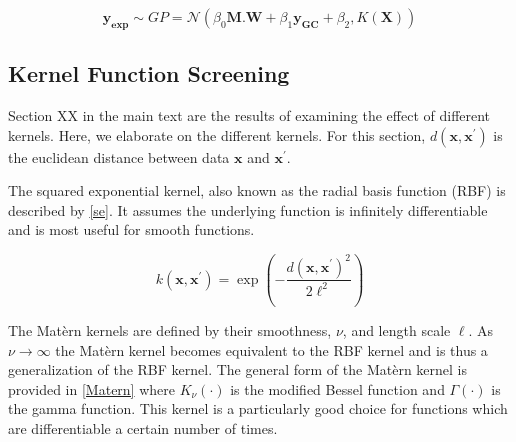\documentclass[journal=jacsat,manuscript=article]{achemso}
\begin{document}
\begin{equation}
    \mathbf{y_{\text{exp}}} \sim GP = \mathcal{N}\left( \beta_{0} \mathbf{M.W} + \beta_{1} \mathbf{y_{GC}} +\beta_{2} , K(\mathbf{X}) \right)
    \label{Method_5}
\end{equation}



\subsection{Kernel Function Screening}

Section XX in the main text are the results of examining the effect of different kernels. Here, we elaborate on the different kernels. For this section, $d(\mathbf{x}, \mathbf{x}^{\prime})$ is the euclidean distance between data $\mathbf{x}$ and $\mathbf{x}^{\prime}$.

The squared exponential kernel, also known as the radial basis function (RBF) is described by \eqref{se}. It assumes the underlying function is infinitely differentiable and is most useful for smooth functions.

\begin{equation}
    k(\mathbf{x}, \mathbf{x}^{\prime}) = \exp\left(-\frac{d(\mathbf{x}, \mathbf{x}^{\prime})^2}{2\ell^2} \right)
    \label{se}
\end{equation}

The Mat\`ern kernels are defined by their smoothness, $\nu$, and length scale $\ell$. As $\nu \rightarrow \infty$ the Mat\`ern kernel becomes equivalent to the RBF kernel and is thus a generalization of the RBF kernel. The general form of the Mat\`ern kernel is provided in \eqref{Matern} where $K_\nu(\cdot)$ is the modified Bessel function and $\Gamma(\cdot)$ is the gamma function. This kernel is a particularly good choice for functions which are differentiable a certain number of times.
\end{document}
